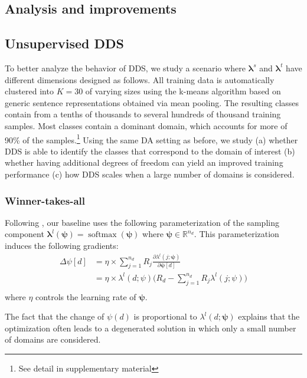 \documentclass[11pt,a4paper]{article}
\newcommand{\fyTodo}[1]{\Todo[FY:]{\textcolor{orange}{#1}}}
\newcommand{\vlambda}{\ensuremath{\boldsymbol\lambda}\xspace} %
\newcommand{\vpsi}{\ensuremath{\boldsymbol\psi}\xspace} %
\begin{document}
\subsection{Analysis and improvements}

\subsection{Unsupervised DDS}
To better analyze the behavior of DDS, we study a scenario where $\vlambda^s$ and $\vlambda^t$ have different dimensions designed as follows. All training data is automatically clustered into $K=30$ of varying sizes using the k-means algorithm based on generic sentence representations obtained via mean pooling. The resulting classes contain from a tenths of thousands to several hundreds of thousand training samples. Most classes contain a dominant domain, which accounts for more of 90\% of the samples.\footnote{See detail in supplementary material} Using the same DA setting as before, we study (a) whether DDS is able to identify the classes that correspond to the domain of interest (b) whether having additional degrees of freedom can yield an improved training performance (c) how DDS scales when a large number of  domains is considered.\fyTodo{TBC - with what experiments?}

\subsubsection{Winner-takes-all}

Following \citep{Wang20balancing}, our baseline uses the following parameterization of the sampling component $\vlambda^l(\vpsi) = \operatorname{softmax}(\vpsi)$ where $\vpsi \in \mathbb{R}^{n_d}$. This parameterization induces the following gradients:\fyTodo{Change name of obj. function}
\begin{align*}
\Delta \psi[d] & = \eta \times \displaystyle{\mathop{\sum}_{j=1}^{n_d}} R_j \frac{\partial \lambda^l(j; \vpsi)}{\partial \vpsi[d]} \\
	& = \eta \times \lambda^l(d; \psi) \big(R_d-\displaystyle{\mathop{\sum}_{j=1}^{n_d}} R_j \lambda^l(j;\psi) \big)\\
\end{align*}
where $\eta$ controls the learning rate of $\vpsi$.

The fact that the change of $\psi(d)$ is proportional to $\lambda^l(d; \vpsi)$ explains that the optimization often leads to a degenerated solution in which only a small number of domains are considered. 
\end{document}
